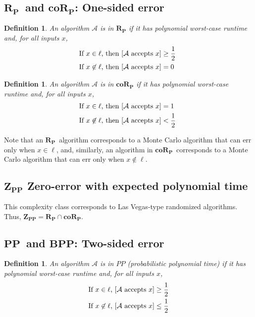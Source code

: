 \documentclass[11pt]{article}
\let\Pr\relax
\DeclareMathOperator*{\Pr}{\mathbb{P}}
\newcommand{\PP}{\ensuremath{\mathbf{PP}}}
\newcommand{\BPP}{\ensuremath{\mathbf{BPP}}}
\newcommand{\ZPP}{\ensuremath{\mathbf{Z_{PP}}}}
\newcommand{\RP}{\ensuremath{\mathbf{R_{P}}}}
\newcommand{\coRP}{\ensuremath{\mathbf{coR_{P}}}}
\newcommand{\Alg}{\ensuremath{\mathcal{A}}}
\newtheorem{definition}[theorem]{Definition}
\begin{document}
\subsection{\RP\ and \coRP: One-sided error }

\begin{definition}
An algorithm $\Alg$ is in $\RP$ if it has polynomial worst-case runtime and, for all inputs $x$,
\begin{align*}
  &\text{If $x \in \ell$, then $\Pr[\Alg \text{ accepts } x] \ge \frac12 $ } \\
  &\text{If $x \not\in \ell$, then $\Pr[\Alg \text{ accepts } x] = 0 $ }
\end{align*}
\end{definition}

\begin{definition}
An algorithm $\Alg$ is in $\coRP$ if it has polynomial worst-case runtime and, for all inputs $x$,
\begin{align*}
  &\text{If $x \in \ell$, then $\Pr[\Alg \text{ accepts } x] = 1 $ } \\
  &\text{If $x \not\in \ell$, then $\Pr[\Alg \text{ accepts } x] < \frac12 $ }
\end{align*}
\end{definition}

Note that an \RP\ algorithm corresponds to a Monte Carlo algorithm that can err only when $x \in \ell$, and, similarly, an algorithm in \coRP\ corresponds to a Monte Carlo algorithm that can err only when $x \notin \ell$.

\subsection{\ZPP\: Zero-error with expected polynomial time}

This complexity class corresponds to Las Vegas-type randomized algorithms. Thus, $\ZPP = \RP \cap \coRP$.

\subsection{\PP\ and \BPP: Two-sided error }

\begin{definition}
An algorithm $\Alg$ is in $PP$ (probabilistic polynomial time) if it has polynomial worst-case runtime and, for all inputs $x$,
\begin{align*}
  &\text{If $x \in \ell$, $\Pr[\Alg \text{ accepts } x] \ge \frac12$} \\
  &\text{If $x \not\in \ell$, $\Pr[\Alg \text{ accepts } x] \le \frac12$}
\end{align*}
\end{definition}
\end{document}
